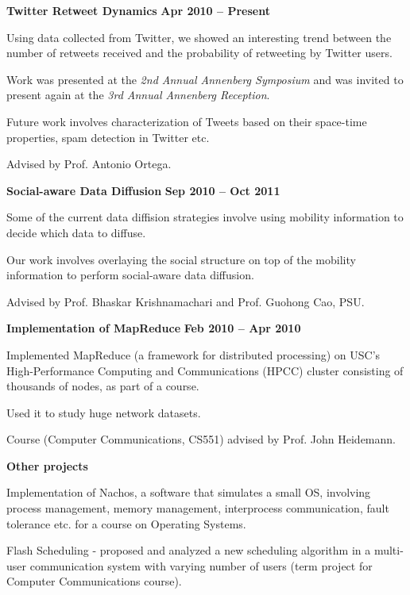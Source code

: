 \documentclass[margin,line]{resume}
\begin{document}
\begin{resume}
  \textbf{Twitter Retweet Dynamics} \hfill \textbf{Apr 2010 -- Present}
  \begin{list2}
   \item Using data collected from Twitter, we showed an interesting trend between the number of retweets received and the probability of retweeting by Twitter users.
   \newpage 
   \item Work was presented at the \textsl{2nd Annual Annenberg Symposium} and was invited to present again at the \textsl{3rd Annual Annenberg Reception}.
   \item Future work involves characterization of Tweets based on their space-time properties, spam detection in Twitter etc. 
   \item Advised by Prof. Antonio Ortega.
  \end{list2}
  

  \textbf{Social-aware Data Diffusion} \hfill \textbf{Sep 2010 -- Oct 2011}
  \begin{list2}
   \item Some of the current data diffision strategies involve using mobility information to decide which data to diffuse. 
   \item Our work involves overlaying the social structure on top of the mobility information to perform social-aware data diffusion.
   \item Advised by Prof. Bhaskar Krishnamachari and Prof. Guohong Cao, PSU.
  \end{list2}

  \textbf{Implementation of MapReduce} \hfill \textbf{Feb 2010 -- Apr 2010}
  \begin{list2}
  \item Implemented MapReduce (a framework for distributed processing) on USC's High-Performance Computing and Communications (HPCC) cluster consisting of thousands of nodes, as part of a course. 
  \item Used it to study huge network datasets. 
  \item Course (Computer Communications, CS551) advised by Prof. John Heidemann. 
  \end{list2}
 
  \textbf{Other projects} 
  \begin{list2}   
   \item Implementation of Nachos, a software that simulates a small OS, involving process management, memory management, interprocess communication, fault tolerance etc. for a course on Operating Systems.
   \item Flash Scheduling - proposed and analyzed a new scheduling algorithm in a multi-user communication system with varying number of users (term project for Computer Communications course).
  \end{list2}



\end{resume}
\end{document}
